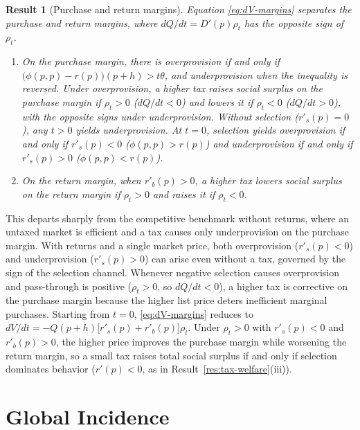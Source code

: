 \documentclass[11pt]{article}
\newtheorem{result}{Result}
\begin{document}
\begin{result}[Purchase and return margins]
\label{res:efficiency-margins}
Equation \eqref{eq:dV-margins} separates the purchase and return margins, where
$dQ/dt=D'(p)\rho_t$ has the opposite sign of $\rho_t$.
\begin{enumerate}
\item[(i)] On the purchase margin, there is overprovision if and only if
$\bigl(\phi(p,p)-r(p)\bigr)(p+h)>t\theta$, and underprovision when the
inequality is reversed. Under overprovision, a higher tax raises social surplus
on the purchase margin if $\rho_t>0$ ($dQ/dt<0$) and lowers it if $\rho_t<0$
($dQ/dt>0$), with the opposite signs under underprovision. Without selection
($r'_s(p)=0$), any $t>0$ yields underprovision. At $t=0$, selection yields
overprovision if and only if $r'_s(p)<0$ ($\phi(p,p)>r(p)$) and underprovision
if and only if $r'_s(p)>0$ ($\phi(p,p)<r(p)$).
\item[(ii)] On the return margin, when $r'_b(p)>0$, a higher tax lowers
social surplus on the return margin if $\rho_t>0$ and raises it if $\rho_t<0$.
\end{enumerate}
\end{result}

This departs sharply from the competitive benchmark without returns, where an
untaxed market is efficient and a tax causes only underprovision on the
purchase margin. With returns and a single market price, both overprovision
($r'_s(p)<0$) and underprovision ($r'_s(p)>0$) can arise even without a tax,
governed by the sign of the selection channel. Whenever negative selection
causes overprovision and pass-through is positive ($\rho_t>0$, so $dQ/dt<0$), a
higher tax is corrective on the purchase margin because the higher list price
deters inefficient marginal purchases. Starting from $t=0$,
\eqref{eq:dV-margins} reduces to
$dV/dt=-Q(p+h)\bigl[r'_s(p)+r'_b(p)\bigr]\rho_t$. Under $\rho_t>0$ with
$r'_s(p)<0$ and $r'_b(p)>0$, the higher price improves the purchase margin
while worsening the return margin, so a small tax raises total social surplus
if and only if selection dominates behavior ($r'(p)<0$, as in
Result~\ref{res:tax-welfare}(iii)).

\section{Global Incidence}
\label{sec:global-incidence}
\end{document}
